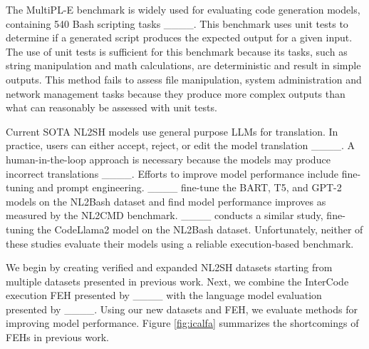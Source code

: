The MultiPL-E benchmark is widely used for evaluating code generation models, containing 540 Bash scripting tasks ____. This benchmark uses unit tests to determine if a generated script produces the expected output for a given input. The use of unit tests is sufficient for this benchmark because its tasks, such as string manipulation and math calculations, are deterministic and result in simple outputs. This method fails to assess file manipulation, system administration and network management tasks because they produce more complex outputs than what can reasonably be assessed with unit tests.

Current SOTA NL2SH models use general purpose LLMs for translation. In practice, users can either accept, reject, or edit the model translation ____. A human-in-the-loop approach is necessary because the models may produce incorrect translations ____. Efforts to improve model performance include fine-tuning and prompt engineering. ____ fine-tune the BART, T5, and GPT-2 models on the NL2Bash dataset and find model performance improves as measured by the NL2CMD benchmark. ____ conducts a similar study, fine-tuning the CodeLlama2 model on the NL2Bash dataset. Unfortunately, neither of these studies evaluate their models using a reliable execution-based benchmark.

We begin by creating verified and expanded NL2SH datasets starting from multiple datasets presented in previous work. Next, we combine the InterCode execution FEH presented by ____ with the language model evaluation presented by ____. Using our new datasets and FEH, we evaluate methods for improving model performance. Figure \ref{fig:icalfa} summarizes the shortcomings of FEHs in previous work.